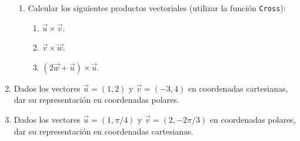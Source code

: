 \documentclass[a4paper]{article}
\begin{document}
\begin{enumerate}[leftmargin=*]
\begin{enumerate}
\item Calcular los siguientes productos vectoriales (utilizar la función \texttt{Cross}):
\begin{enumerate}
\item $\vec{u}\times\vec{v}$.
\item $\vec{v}\times\vec{w}$.
\item $(2\vec{w}+\vec{u})\times \vec{u}$.
\end{enumerate}
\end{enumerate}
\item Dados los vectores $\vec{u}=(1,2)$ y $\vec{v}=(-3,4)$ en coordenadas cartesianas, dar su representación en coordenadas polares.
\item Dados los vectores $\vec{u}=(1,\pi/4)$ y $\vec{v}=(2,-2\pi/3)$ en coordenadas polares, dar su representación en coordenadas cartesianas.
\end{enumerate}
\end{document}
